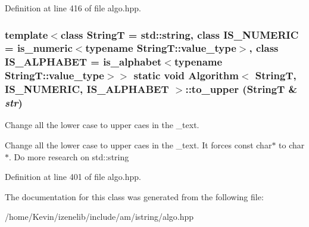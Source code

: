Definition at line 416 of file algo.hpp.\hypertarget{classAlgorithm_42e06428b21a425ac2da8d60313ab9a9}{
\subsubsection[{to\_\-upper}]{\setlength{\rightskip}{0pt plus 5cm}template$<$class StringT  = std::string, class IS\_\-NUMERIC  = is\_\-numeric$<$typename StringT::value\_\-type$>$, class IS\_\-ALPHABET  = is\_\-alphabet$<$typename StringT::value\_\-type$>$$>$ static void {\bf Algorithm}$<$ StringT, IS\_\-NUMERIC, IS\_\-ALPHABET $>$::to\_\-upper (StringT \& {\em str})}}
\label{classAlgorithm_42e06428b21a425ac2da8d60313ab9a9}


Change all the lower case to upper caes in the \_\-text. 

Change all the lower case to upper caes in the \_\-text. It forces const char$\ast$ to char$\ast$. Do more research on std::string 

Definition at line 401 of file algo.hpp.

The documentation for this class was generated from the following file:\begin{CompactItemize}
\item 
/home/Kevin/izenelib/include/am/istring/algo.hpp\end{CompactItemize}
